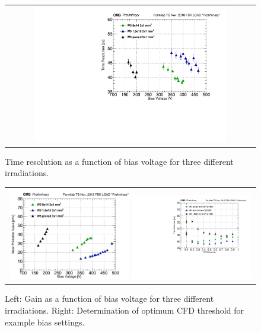 \documentclass[preprint,1p]{elsarticle}
\begin{document}


\begin{figure}[htp] 
\centering 
\begin{tabular}{c} 
\includegraphics[width=0.79\textwidth]{fig/tP_VScan}  

\end{tabular} 
\caption{Time resolution as a function of bias voltage for three different irradiations.}
\label{fig:tp_VScan} 
\end{figure} 

\begin{figure}[htp] 
\centering 
\begin{tabular}{c} 
\includegraphics[width=0.49\textwidth]{fig/mpv_VScan}  
\includegraphics[width=0.49\textwidth]{fig/cfdScan}  

\end{tabular} 
\caption{Left: Gain as a function of bias voltage for three different irradiations. Right: Determination of optimum CFD threshold for example bias settings.}
\label{fig:gain_cfd_scan} 
\end{figure} 
\end{document}

